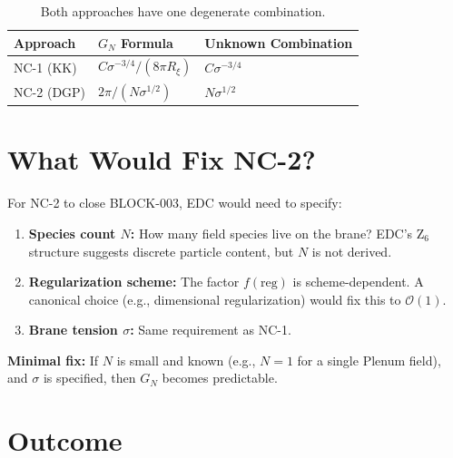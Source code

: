 \documentclass[11pt,a4paper]{article}
\theoremstyle{definition}
\begin{document}
\begin{table}[h]
\centering
\begin{tabular}{lll}
\toprule
\textbf{Approach} & \textbf{$G_N$ Formula} & \textbf{Unknown Combination} \\
\midrule
NC-1 (KK) & $C \sigma^{-3/4} / (8\pi R_\xi)$ & $C \sigma^{-3/4}$ \\
NC-2 (DGP) & $2\pi / (N \sigma^{1/2})$ & $N \sigma^{1/2}$ \\
\bottomrule
\end{tabular}
\caption{Both approaches have one degenerate combination.}
\end{table}

\section{What Would Fix NC-2?}

For NC-2 to close BLOCK-003, EDC would need to specify:

\begin{enumerate}
\item \textbf{Species count $N$:} How many field species live on the brane?
EDC's Z$_6$ structure suggests discrete particle content, but $N$ is not
derived.

\item \textbf{Regularization scheme:} The factor $f(\text{reg})$ is
scheme-dependent. A canonical choice (e.g., dimensional regularization)
would fix this to $\mathcal{O}(1)$.

\item \textbf{Brane tension $\sigma$:} Same requirement as NC-1.
\end{enumerate}

\textbf{Minimal fix:} If $N$ is small and known (e.g., $N = 1$ for a
single Plenum field), and $\sigma$ is specified, then $G_N$ becomes
predictable.

\section{Outcome}
\end{document}
